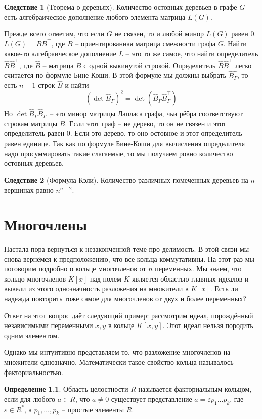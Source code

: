 \documentclass[10pt,a4paper,oneside]{book}
\theoremstyle{definition}
\newtheorem*{defn}{\color{yellow!30!red} Определение}
\newtheorem{cor}{\color{green!45!black}Следствие}
\def\eps{\varepsilon}
\def\dfn{\begin{defn}}
\def\edfn{\end{defn}}
\def\crl{\begin{cor}}
\def\ecrl{\end{cor}}
\begin{document}
\crl[Теорема о деревьях] Количество остовных деревьев в графе $G$ есть алгебраическое дополнение любого элемента матрица $L(G)$.
\ecrl
\proof Прежде всего отметим, что если $G$ не связен, то и любой минор $L(G)$ равен $0$. $L(G)=BB^\top$, где $B$ -- ориентированная матрица смежности графа $G$. Найти какое-то алгебраическое дополнение $L$ -- это то же самое, что найти определитель $\hat{B}\hat{B}^\top$, где $\hat{B}$ -- матрица $B$ с одной выкинутой строкой. Определитель $\hat B \hat{B}^\top$ легко считается по формуле Бине-Коши. В этой формуле мы должны выбрать $\hat{B_{\Gamma}}$, то есть $n-1$ строк $\hat{B}$ и найти
$$(\det \hat{B}_{\Gamma})^2=\det(\hat{B}_{\Gamma} \hat{B}_{\Gamma}^\top)$$
Но $\det \hat{B}_{\Gamma} \hat{B}_{\Gamma}^\top$ -- это минор матрицы Лапласа графа, чьи рёбра соответствуют строкам матрицы $B$. Если этот граф  -- не дерево, то он не связен и этот определитель равен $0$. Если это дерево, то оно остовное и этот определитель равен единице. Так как по формуле Бине-Коши для вычисления определителя надо просуммировать такие слагаемые, то мы получаем ровно количество остовных деревьев.
\endproof


\crl[Формула Кэли] Количество различных помеченных деревьев на $n$ вершинах равно $n^{n-2}$.
\ecrl


\chapter{Многочлены}

Настала пора вернуться к незаконченной теме про делимость. В этой связи мы снова вернёмся к предположению, что все кольца коммутативны. На этот раз мы поговорим подробно о кольце многочленов от $n$ переменных. Мы знаем, что кольцо многочленов $K[x]$ над полем $K$ является областью главных идеалов и вывели из этого однозначность разложения на множители в $K[x]$. Есть ли надежда повторить тоже самое для многочленов от двух и более переменных? 

Ответ на этот вопрос даёт следующий пример: рассмотрим идеал, порождённый независимыми переменными $x,y$ в кольце $K[x,y]$. Этот идеал нельзя породить одним элементом.

Однако мы интуитивно представляем то, что разложение многочленов на множители однозначно. Математически такое свойство кольца называлось факториальностью.

\dfn
Область целостности $R$ называется факториальным кольцом, если для любого $a\in R$, что $a\neq 0$  существует представление $a=\eps p_1\dots p_k$, где $\eps \in R^*$, а $p_1,\dots,p_k$ -- простые элементы $R$.
\edfn
\end{document}
